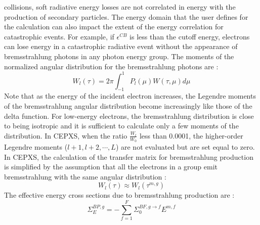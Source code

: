 collisions, soft radiative energy losses are not correlated in energy with the
production of secondary particles. The energy domain that the user defines for
the calculation can also impact the extent of the energy correlation for
catastrophic events. For example, if $\epsilon^{CB}$ is less than the cutoff
energy, electrons can lose energy in a catastrophic radiative event without
the appearance of bremsstrahlung photons in any photon energy group. The
moments of the normalized angular distribution for the bremsstrahlung photons
are :
\begin{equation}
W_l(\tau) = 2\pi \int_{-1}^1 P_l(\mu) W(\tau,\mu) d\mu
\end{equation}
Note that as the energy of the incident electron increases, the Legendre
moments of the bremsstrahlung angular distribution become increasingly like
those of the delta function. For low-energy electrons, the bremsstrahlung
distribution is close to being isotropic and it is sufficient to calculate
only a few moments of the distribution. In CEPXS, when the ratio
$\frac{W_l}{W_0}$ less than 0.0001, the higher-order Legendre moments
($l+1,l+2,\cdots,L$) are not evaluated but are set equal to zero.\\
In CEPXS, the calculation of the transfer matrix for bremsstrahlung production
is simplified by the assumption that all the electrons in a group emit
bremsstrahlung with the same angular distribution :
\begin{equation}
W_l(\tau) \approx W_l(\tau^{m,g})
\end{equation}
The effective energy cross sections due to bremsstrahlung production are :
\begin{equation}
\Sigma_{E}^{BP,g} = - \sum_{f=1}^F \Sigma_{0}^{BF,g\rightarrow f}
E^{m,f}
\end{equation}

